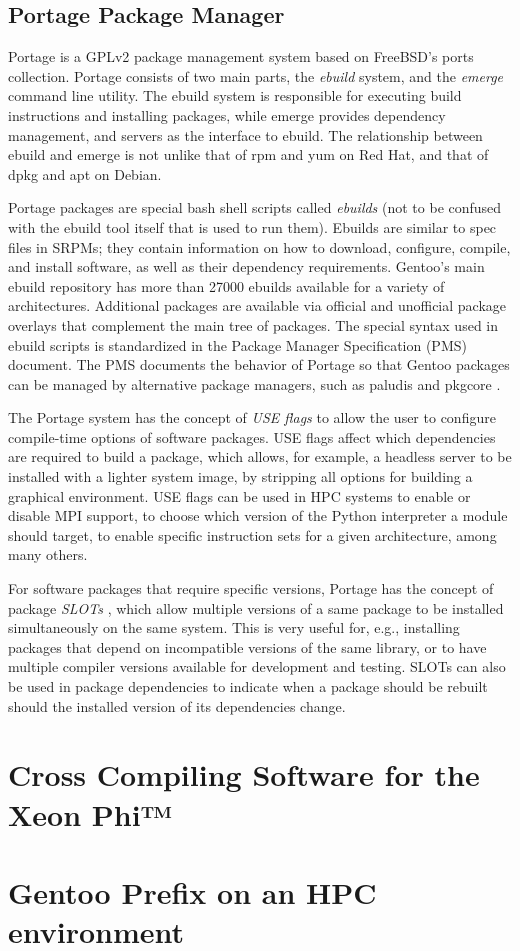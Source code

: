 \documentclass[a4paper,conference]{IEEEtran}
\begin{document}
\subsection{Portage Package Manager}

Portage is a GPLv2 package management system based on FreeBSD's ports
collection. Portage consists of two main parts, the \emph{ebuild}
system, and the \emph{emerge} command line utility. The ebuild system is
responsible for executing build instructions and installing packages,
while emerge provides dependency management, and servers as the
interface to ebuild. The relationship between ebuild and emerge is not
unlike that of rpm and yum on Red Hat, and that of dpkg and apt on
Debian.

Portage packages are special bash shell scripts called \emph{ebuilds}
(not to be confused with the ebuild tool itself that is used to run
them). Ebuilds are similar to spec files in SRPMs; they contain
information on how to download, configure, compile, and install
software, as well as their dependency requirements. Gentoo's main ebuild
repository has more than 27000 ebuilds available for a variety of
architectures. Additional packages are available via official and
unofficial package overlays that complement the main tree of packages.
The special syntax used in ebuild scripts is standardized in the Package
Manager Specification (PMS) \cite{gentoo:pms} document. The PMS
documents the behavior of Portage so that Gentoo packages can be managed
by alternative package managers, such as paludis \cite{paludis} and pkgcore \cite{pkgcore}.

The Portage system has the concept of \emph{USE flags} to allow the user
to configure compile-time options of software packages. USE flags affect
which dependencies are required to build a package, which allows, for
example, a headless server to be installed with a lighter system image,
by stripping all options for building a graphical environment. USE flags
can be used in HPC systems to enable or disable MPI support, to choose
which version of the Python interpreter a module should target, to
enable specific instruction sets for a given architecture, among many
others.

For software packages that require specific versions, Portage has the
concept of package \emph{SLOTs} \cite[p.~27]{gentoo:pms}, which allow multiple versions of a same
package to be installed simultaneously on the same system. This is very
useful for, e.g., installing packages that depend on incompatible
versions of the same library, or to have multiple compiler versions
available for development and testing. SLOTs can also be used in package
dependencies to indicate when a package should be rebuilt should the
installed version of its dependencies change.


\section{Cross Compiling Software for the Xeon Phi™}

\section{Gentoo Prefix on an HPC environment}



\end{document}

